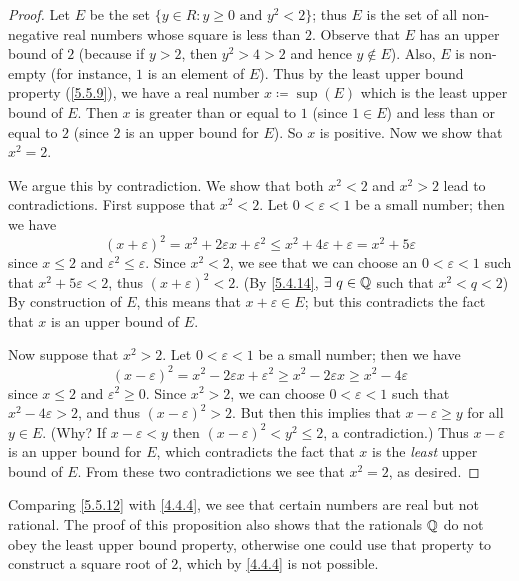 \begin{proof}
  Let \(E\) be the set \(\{y \in R : y \geq 0 \text{ and } y^2 < 2\}\);
  thus \(E\) is the set of all non-negative real numbers whose square is less than \(2\).
  Observe that \(E\) has an upper bound of \(2\) (because if \(y > 2\), then \(y^2 > 4 > 2\) and hence \(y \notin E\)).
  Also, \(E\) is non-empty (for instance, \(1\) is an element of \(E\)).
  Thus by the least upper bound property (\cref{5.5.9}), we have a real number \(x \coloneqq \sup(E)\) which is the least upper bound of \(E\).
  Then \(x\) is greater than or equal to \(1\) (since \(1 \in E\)) and less than or equal to \(2\)
  (since \(2\) is an upper bound for \(E\)).
  So \(x\) is positive.
  Now we show that \(x^2 = 2\).

  We argue this by contradiction.
  We show that both \(x^2 < 2\) and \(x^2 > 2\) lead to contradictions.
  First suppose that \(x^2 < 2\).
  Let \(0 < \varepsilon < 1\) be a small number;
  then we have
  \[
    (x + \varepsilon)^2 = x^2 + 2\varepsilon x + \varepsilon^2 \leq x^2 + 4\varepsilon + \varepsilon = x^2 + 5\varepsilon
  \]
  since \(x \leq 2\) and \(\varepsilon^2 \leq \varepsilon\).
  Since \(x^2 < 2\), we see that we can choose an \(0 < \varepsilon < 1\) such that \(x^2 + 5\varepsilon < 2\), thus \((x + \varepsilon)^2 < 2\).
  (By \cref{5.4.14}, \(\exists\ q \in \mathbb{Q}\) such that \(x^2 < q < 2\))
  By construction of \(E\), this means that \(x + \varepsilon \in E\);
  but this contradicts the fact that \(x\) is an upper bound of \(E\).

  Now suppose that \(x^2 > 2\).
  Let \(0 < \varepsilon < 1\) be a small number;
  then we have
  \[
    (x - \varepsilon)^2 = x^2 - 2\varepsilon x + \varepsilon^2 \geq x^2 - 2\varepsilon x \geq x^2 - 4\varepsilon
  \]
  since \(x \leq 2\) and \(\varepsilon^2 \geq 0\).
  Since \(x^2 > 2\), we can choose \(0 < \varepsilon < 1\) such that \(x^2 - 4\varepsilon > 2\), and thus \((x - \varepsilon)^2 > 2\).
  But then this implies that \(x - \varepsilon \geq y\) for all \(y \in E\).
  (Why? If \(x - \varepsilon < y\) then \((x - \varepsilon)^2 < y^2 \leq 2\), a contradiction.)
  Thus \(x - \varepsilon\) is an upper bound for \(E\), which contradicts the fact that \(x\) is the \emph{least} upper bound of \(E\).
  From these two contradictions we see that \(x^2 = 2\), as desired.
\end{proof}

\begin{rmk}\label{5.5.13}
  Comparing \cref{5.5.12} with \cref{4.4.4}, we see that certain numbers are real but not rational.
  The proof of this proposition also shows that the rationals \(\mathbb{Q}\) do not obey the least upper bound property, otherwise one could use that property to construct a square root of \(2\), which by \cref{4.4.4} is not possible.
\end{rmk}

